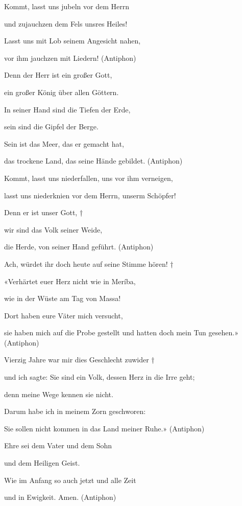 Kommt, lasst uns jubeln vor dem Herrn~\GreStar{}~\nopagebreak

und zujauchzen dem Fels unsres Heiles!

Lasst uns mit Lob seinem Angesicht nahen,~\GreStar{}~\nopagebreak

vor ihm jauchzen mit Liedern! (Antiphon)

\vspace{5pt}

Denn der Herr ist ein großer Gott,~\GreStar{}~\nopagebreak

ein großer König über allen Göttern.

In seiner Hand sind die Tiefen der Erde,~\GreStar{}~\nopagebreak

sein sind die Gipfel der Berge.

Sein ist das Meer, das er gemacht hat,~\GreStar{}~\nopagebreak

das trockene Land, das seine Hände gebildet. (Antiphon)
 
 \vspace{5pt}

Kommt, lasst uns niederfallen, uns vor ihm verneigen,~\GreStar{}~\nopagebreak

lasst uns niederknien vor dem Herrn, unserm Schöpfer!

Denn er ist unser Gott, † 

wir sind das Volk seiner Weide,~\GreStar{}~\nopagebreak

die Herde, von seiner Hand geführt. (Antiphon)

\vspace{5pt} 

Ach, würdet ihr doch heute auf seine Stimme hören! † 

«Verhärtet euer Herz nicht wie in Meríba,~\GreStar{}~\nopagebreak

wie in der Wüste am Tag von Massa!

Dort haben eure Väter mich versucht,~\GreStar{}~\nopagebreak

sie haben mich auf die Probe gestellt und hatten doch mein Tun gesehen.» (Antiphon)
 
 \vspace{5pt}

Vierzig Jahre war mir dies Geschlecht zuwider † 

und ich sagte: Sie sind ein Volk, dessen Herz in die Irre geht;~\GreStar{}~\nopagebreak

denn meine Wege kennen sie nicht.

Darum habe ich in meinem Zorn geschworen:~\GreStar{}~\nopagebreak

Sie sollen nicht kommen in das Land meiner Ruhe.» (Antiphon)
 
\vspace{5pt}

Ehre sei dem Vater und dem Sohn~\GreStar{}~\nopagebreak

und dem Heiligen Geist.

Wie im Anfang so auch jetzt und alle Zeit~\GreStar{}~\nopagebreak

und in Ewigkeit. Amen. (Antiphon)
